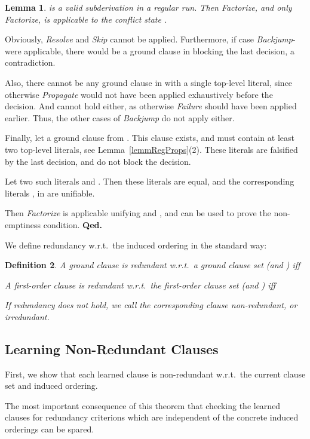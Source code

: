 \documentclass[a4paper]{article}
\newcommand{\startproof}{{\bf Proof:~}}
\newcommand{\finishproof}{{\bf Qed.}}
\newtheorem{defi}{Definition}[section]
\newtheorem{lemm}[defi]{Lemma}
\begin{document}
{\begin{lemm}
is a valid subderivation in a regular run. 
Then \emph{Factorize}, and only \emph{Factorize}, is applicable to the conflict state .
\end{lemm}
\noindent\startproof
Obviously, \emph{Resolve} and \emph{Skip} cannot be applied. 
Furthermore, if case \emph{Backjump}- were applicable, 
there would be a ground clause in  
blocking the last decision, a contradiction. 

Also, there cannot be any ground clause in  with a single top-level literal, since otherwise \emph{Propagate} would not have been applied exhaustively 
before the decision. And  cannot hold either, as otherwise \emph{Failure} should have been applied earlier. 
Thus, the other cases of \emph{Backjump} do not apply either.

Finally, let  a ground clause from . 
This clause exists, and must contain at least two top-level literals, see Lemma~\ref{lemmRegProps}(2). 
These literals are falsified by the last decision, and do not block the decision. 

Let  two such literals and . 
Then these literals are equal, and the corresponding literals ,  in  
are unifiable. 

Then \emph{Factorize} is applicable unifying  and , and  can be used to prove the non-emptiness condition.
\finishproof

We define redundancy w.r.t.\ 
the induced ordering  in the standard way:
\begin{defi}\label{a-redundancyDefs}
A ground clause  is \emph{redundant w.r.t.\
a ground clause set  (and )} iff

A first-order clause  is \emph{redundant w.r.t.\
the first-order clause set  (and )} iff

If redundancy does not hold, we call the corresponding clause \emph{non-redundant}, or \emph{irredundant}.
\end{defi}
\subsection{Learning Non-Redundant Clauses}
First, we show that each learned clause is non-redundant w.r.t.\
the current clause set and induced ordering.

The most important consequence of this theorem that checking the learned clauses for 
redundancy criterions which are independent of the concrete induced orderings can be spared. 

}
\end{document}
